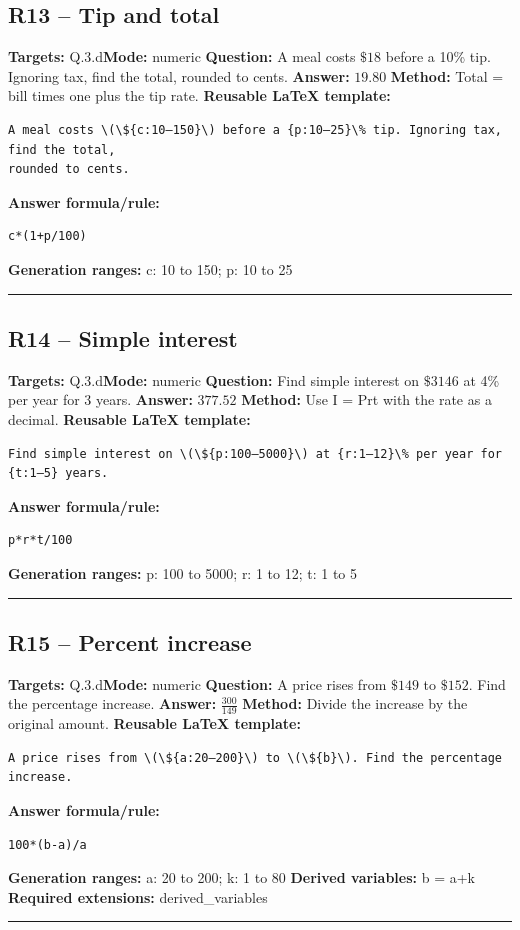 \documentclass[11pt]{article}
\begin{document}
\subsection{R13 -- Tip and total}
\textbf{Targets:} Q.3.d\quad\textbf{Mode:} numeric
\textbf{Question:} A meal costs \(\$18\) before a 10\% tip. Ignoring tax, find the total, rounded to cents.
\textbf{Answer:} \(19.80\)
\textbf{Method:} Total = bill times one plus the tip rate.
\textbf{Reusable LaTeX template:}
\begin{verbatim}
A meal costs \(\${c:10–150}\) before a {p:10–25}\% tip. Ignoring tax, find the total,
rounded to cents.
\end{verbatim}
\textbf{Answer formula/rule:}
\begin{verbatim}
c*(1+p/100)
\end{verbatim}
\textbf{Generation ranges:} c: 10 to 150; p: 10 to 25
\medskip\hrule\medskip
\subsection{R14 -- Simple interest}
\textbf{Targets:} Q.3.d\quad\textbf{Mode:} numeric
\textbf{Question:} Find simple interest on \(\$3146\) at 4\% per year for 3 years.
\textbf{Answer:} \(377.52\)
\textbf{Method:} Use I = Prt with the rate as a decimal.
\textbf{Reusable LaTeX template:}
\begin{verbatim}
Find simple interest on \(\${p:100–5000}\) at {r:1–12}\% per year for {t:1–5} years.
\end{verbatim}
\textbf{Answer formula/rule:}
\begin{verbatim}
p*r*t/100
\end{verbatim}
\textbf{Generation ranges:} p: 100 to 5000; r: 1 to 12; t: 1 to 5
\medskip\hrule\medskip
\subsection{R15 -- Percent increase}
\textbf{Targets:} Q.3.d\quad\textbf{Mode:} numeric
\textbf{Question:} A price rises from \(\$149\) to \(\$152\). Find the percentage increase.
\textbf{Answer:} \(\frac{300}{149}\)
\textbf{Method:} Divide the increase by the original amount.
\textbf{Reusable LaTeX template:}
\begin{verbatim}
A price rises from \(\${a:20–200}\) to \(\${b}\). Find the percentage increase.
\end{verbatim}
\textbf{Answer formula/rule:}
\begin{verbatim}
100*(b-a)/a
\end{verbatim}
\textbf{Generation ranges:} a: 20 to 200; k: 1 to 80
\textbf{Derived variables:} b = a+k
\textbf{Required extensions:} derived\_variables
\medskip\hrule\medskip
\end{document}
